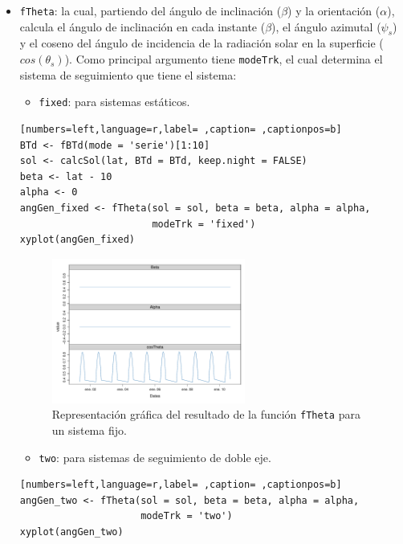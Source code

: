 \begin{itemize}
\item \texttt{fTheta}: la cual, partiendo del ángulo de inclinación (\(\beta\)) y la orientación (\(\alpha\)), calcula el ángulo de inclinación en cada instante (\(\beta\)), el ángulo azimutal (\(\psi_s\)) y el coseno del ángulo de incidencia  de la radiación solar en la superficie (\(cos(\theta_s)\)).
Como principal argumento tiene \texttt{modeTrk}, el cual determina el sistema de seguimiento que tiene el sistema:
\begin{itemize}
\item \texttt{fixed}: para sistemas estáticos.
\end{itemize}
\begin{lstlisting}[numbers=left,language=r,label= ,caption= ,captionpos=b]
BTd <- fBTd(mode = 'serie')[1:10]
sol <- calcSol(lat, BTd = BTd, keep.night = FALSE)
beta <- lat - 10
alpha <- 0
angGen_fixed <- fTheta(sol = sol, beta = beta, alpha = alpha,
                       modeTrk = 'fixed')
xyplot(angGen_fixed)
\end{lstlisting}

\begin{figure}[!htb]
\centering
\includegraphics[width=0.6\textwidth]{figuras/codigo-fthetafixed.pdf}
\caption{Representación gráfica del resultado de la función \texttt{fTheta} para un sistema fijo.}
\end{figure}
\FloatBarrier
\begin{itemize}
\item \texttt{two}: para sistemas de seguimiento de doble eje.
\end{itemize}
\begin{lstlisting}[numbers=left,language=r,label= ,caption= ,captionpos=b]
angGen_two <- fTheta(sol = sol, beta = beta, alpha = alpha,
                     modeTrk = 'two')
xyplot(angGen_two)
\end{lstlisting}


\end{itemize}
